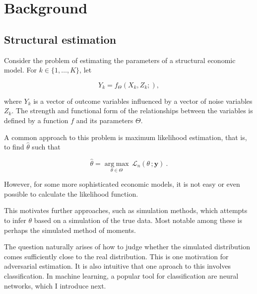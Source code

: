 
\section{Background} %
\label{sec:background}

\subsection{Structural estimation}
\label{sec:structural_estimation}

Consider the problem of estimating the parameters of a structural economic model.
For $k \in \{1,\dots,K\}$, let

\begin{equation}
    Y_k = f_{\Theta}(X_k, Z_k; ),
\end{equation}

where $Y_k$ is a vector of outcome variables influenced by a vector of noise variables $Z_k$. %
The strength and functional form of the relationships between the variables is defined by a function $f$ and its parameters $\Theta$.

A common approach to this problem is maximum likelihood estimation, that is, to find $\hat{\theta}$ such that

\begin{equation}
    \hat{\theta} = \underset{\theta\in\Theta}{\operatorname{arg\;max}}\,\mathcal{L}_{n}(\theta\,;\mathbf{y}) ~.
\end{equation}

However, for some more sophisticated economic models, it is not easy or even possible to calculate the likelihood function.

This motivates further approaches, such as simulation methods, which attempts to infer $\theta$ based on a simulation of the true data.
Most notable among these is perhaps the simulated method of moments.

The question naturally arises of how to judge whether the simulated distribution comes sufficiently close to the real distribution.
This is one motivation for adversarial estimation.
It is also intuitive that one aproach to this involves classification.
In machine learning, a popular tool for classification are neural networks, which I introduce next.

